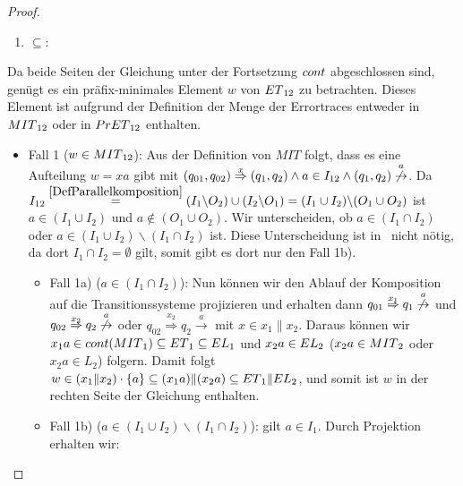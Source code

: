 \begin{proof}
  ~
  \begin{enumerate}
    \item \glqq $\subseteq$\grqq :
  \end{enumerate}
  \vspace{-0.3cm}
  Da beide Seiten der Gleichung unter der Fortsetzung $cont{}$ abgeschlossen sind, genügt es ein
  präfix-minimales Element $w$ von $ET{}_{12}$ zu betrachten. Dieses Element ist
  aufgrund der Definition der Menge der Errortraces entweder in $MIT{}_{12}$ oder in
  $PrET{}_{12}$ enthalten.\\
  \begin{itemize}
    \item Fall 1 ($w\in MIT{}_{12}$): Aus der Definition von $MIT$ folgt, dass es eine
  Aufteilung $w=xa$ gibt mit $(q_{01},q_{02})
  \overset{x}{\Rightarrow}(q_1,q_2)\wedge a\in I_{12}\wedge (q_1,q_2)
  \overset{a}{\not{\hspace{-0.1cm}\rightarrow}}$. Da $I_{12}
  \overset{\ref{DefParallelkomposition}}{=}(I_1\backslash O_2)\cup
  (I_2\backslash O_1)=(I_1\cup I_2)\backslash (O_1\cup O_2)$ ist $a\in (I_1\cup
  I_2)$ und $a\notin (O_1\cup O_2)$. Wir unterscheiden, ob $a\in (I_1\cap I_2)$
  oder $a\in (I_1\cup I_2)\backslash (I_1\cap I_2)$ ist. Diese Unterscheidung
  ist in~\cite{Vogler2014EIO} nicht nötig, da dort $I_1\cap I_2=\emptyset$
  gilt, somit gibt es dort nur den Fall 1b).
  \begin{itemize}
    \item Fall 1a) ($a\in (I_1\cap I_2)$): Nun können wir den Ablauf der
      Komposition auf die Transitionssysteme projizieren und erhalten dann \oBdA{}
      $q_{01}\overset{x_1}{\Rightarrow} q_1
      \overset{a}{\not{\hspace{-0.1cm}\rightarrow}}$ und
      $q_{02}\overset{x_2}{\Rightarrow} q_2
      \overset{a}{\not{\hspace{-0.1cm}\rightarrow}}$ oder
      $q_{02}\overset{x_2}{\Rightarrow} q_2 \overset{a}{\rightarrow}$ mit $x\in
      x_1\|x_2$. Daraus können wir $x_1a\in cont{}(MIT{}_1)\subseteq ET{}_1\subseteq
      EL{}_1$ und $x_2a\in EL{}_2$ ($x_2a\in MIT{}_2$ oder $x_2a\in L_2$)
      folgern. Damit folgt $w\in (x_1\|x_2)\cdot\{a\}\subseteq
      (x_1a)\|(x_2a)\subseteq ET{}_1\|EL{}_2$, und somit ist $w$ in der
      rechten Seite der Gleichung enthalten.
  \item Fall 1b) ($a\in (I_1\cup I_2)\backslash(I_1\cap I_2)$): \OBdA{} gilt
      $a\in I_1$. Durch Projektion erhalten wir:

\end{itemize}
\end{itemize}
\end{proof}
